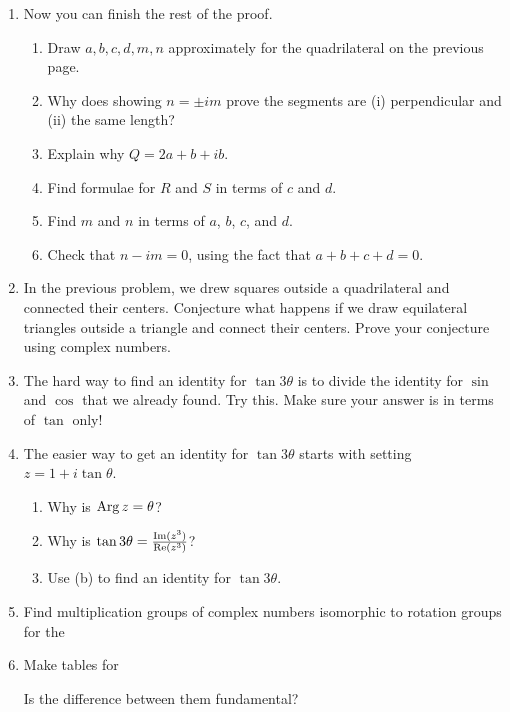 \documentclass[../gatm.tex]{subfiles}
\begin{document}
\begin{enumerate}
\setcounter{enumi}{\value{cg_problem_i}}
\item Now you can finish the rest of the proof.
\begin{enumerate}
\item Draw $a,b,c,d,m,n$ approximately for the quadrilateral on the previous page.
\item Why does showing $n=\pm im$ prove the segments are (i) perpendicular and (ii) the same length?
\item Explain why $Q=2a+b+ib$.
\item Find formulae for $R$ and $S$ in terms of $c$ and $d$.
\item Find $m$ and $n$ in terms of $a$, $b$, $c$, and $d$.
\item Check that $n-im=0$, using the fact that $a+b+c+d=0$.
\end{enumerate}
\item In the previous problem, we drew squares outside a quadrilateral and connected their centers. Conjecture what happens if we draw equilateral triangles outside a triangle and connect their centers. Prove your conjecture using complex numbers.
\item The hard way to find an identity for $\tan 3\theta$ is to divide the identity for $\sin$ and $\cos$ that we already found. Try this. Make sure your answer is in terms of $\tan$ only!
\item The easier way to get an identity for $\tan 3\theta$ starts with setting $z = 1 + i\tan\theta$.
\begin{enumerate}
\item Why is $\operatorname{Arg} z = \theta$?
\item Why is $\tan 3\theta = \frac{\operatorname{Im}(z^3)}{\operatorname{Re}(z^3)}$?
\item Use (b) to find an identity for $\tan 3\theta$.
\end{enumerate}
\item Find multiplication groups of complex numbers isomorphic to rotation groups for the
\begin{enumerate}
\end{enumerate}
\item Make tables for
\begin{enumerate}
\end{enumerate}
Is the difference between them fundamental?


\end{enumerate}
\end{document}
